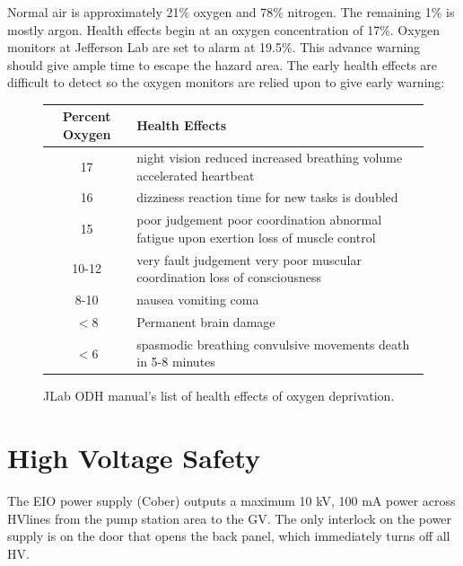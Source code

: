 Normal air is approximately 21\% oxygen and 78\% nitrogen. The remaining 1\% is mostly argon. Health effects begin at an oxygen concentration of 17\%. Oxygen monitors at Jefferson Lab are set to alarm at 19.5\%. This advance warning should give ample time to escape the hazard area.  The early health effects are difficult to detect so the oxygen monitors are relied upon to give early warning:

\begin{figure}
\centering
\begin{tabular}{|c|p{6cm}|}
 \hline
Percent Oxygen & Health Effects \\
\hline
17 & night vision reduced \newline increased breathing volume \newline accelerated heartbeat \\
\hline
16 & dizziness \newline reaction time for new tasks is doubled\\
\hline
15 & poor judgement \newline poor coordination \newline abnormal fatigue upon exertion \newline loss of muscle control\\
\hline
10-12 & very fault judgement \newline very poor muscular coordination \newline loss of consciousness\\
\hline
8-10& nausea \newline vomiting \newline coma\\
\hline
$<$8 & Permanent brain damage \\
\hline
$<$6 & spasmodic breathing \newline convulsive movements \newline death in 5-8 minutes \\
\hline
\end{tabular} 
\caption{JLab ODH manual's list of health effects of oxygen deprivation.}
\label{fig:jlabodh}
\end{figure}

\section{High Voltage Safety}

The EIO power supply (Cober) outputs a maximum 10 kV, 100 mA power across HVlines from the pump station area to the GV.  The only interlock on the power supply is on the door that opens the back panel, which immediately turns off all HV.

